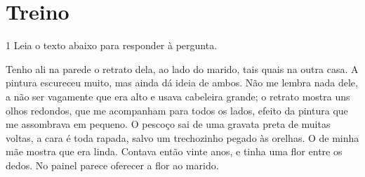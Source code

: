 \section*{Treino}

\num{1} Leia o texto abaixo para responder à pergunta.

\begin{myquote}


\begin{minipage}{0.6\textwidth}
Tenho ali na parede o retrato dela, ao lado do marido, tais quais na outra
casa. A pintura escureceu muito, mas ainda dá ideia de ambos. Não me lembra
nada dele, a não ser vagamente que era alto e usava cabeleira grande; o
retrato mostra uns olhos redondos, que me acompanham para todos os lados,
efeito da pintura que me assombrava em pequeno. O pescoço sai de uma gravata
preta de muitas voltas, a cara é toda rapada, salvo um trechozinho pegado às
orelhas. O de minha mãe mostra que era linda. Contava então vinte anos, e
tinha uma flor entre os dedos. No painel parece oferecer a flor ao marido.
\end{minipage}
\hfill
\begin{minipage}{0.35\textwidth}
  \centering

\end{minipage}
\end{myquote}
